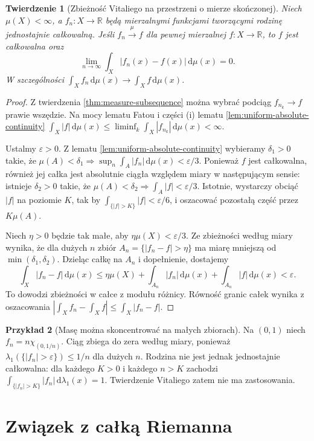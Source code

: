\documentclass[11pt,a4paper,oneside]{book}
\numberwithin{equation}{chapter}
\theoremstyle{plain}
\newtheorem{twierdzenie}{Twierdzenie}[chapter]
\theoremstyle{definition}
\newtheorem{przyklad}[twierdzenie]{Przykład}
\theoremstyle{remark}
\begin{document}
\begin{twierdzenie}[Zbieżność Vitaliego na przestrzeni o mierze skończonej]
\label{thm:vitali-l1}
Niech $\mu(X)<\infty$, a $f_n:X\to\mathbb R$ będą
mierzalnymi funkcjami tworzącymi rodzinę
jednostajnie całkowalną. Jeśli
$f_n\xrightarrow{\mu}f$ dla pewnej mierzalnej
$f:X\to\mathbb R$, to $f$ jest całkowalna oraz
\[
\lim_{n\to\infty}\int_X|f_n(x)-f(x)|\,\mathrm d\mu(x)=0.
\]
W szczególności $\int_Xf_n\,\mathrm d\mu(x)\to
\int_Xf\,\mathrm d\mu(x)$.
\end{twierdzenie}
\begin{proof}
Z twierdzenia \ref{thm:measure-subsequence}
można wybrać podciąg $f_{n_k}\to f$ prawie wszędzie.
Na mocy lematu Fatou i części (i) lematu
\ref{lem:uniform-absolute-continuity}
$\int_X|f|\,\mathrm d\mu(x)\le
\liminf_k\int_X|f_{n_k}|\,\mathrm d\mu(x)<\infty$.

Ustalmy $\varepsilon>0$. Z lematu
\ref{lem:uniform-absolute-continuity} wybieramy
$\delta_1>0$ takie, że
$\mu(A)<\delta_1\Rightarrow
\sup_n\int_A|f_n|\,\mathrm d\mu(x)<\varepsilon/3$.
Ponieważ $f$ jest całkowalna, również jej całka
jest absolutnie ciągła względem miary w następującym
sensie: istnieje $\delta_2>0$ takie, że
$\mu(A)<\delta_2\Rightarrow\int_A|f|<\varepsilon/3$.
Istotnie, wystarczy obciąć $|f|$ na poziomie $K$,
tak by $\int_{\{|f|>K\}}|f|<\varepsilon/6$,
i oszacować pozostałą część przez $K\mu(A)$.

Niech $\eta>0$ będzie tak małe, aby
$\eta\mu(X)<\varepsilon/3$. Ze zbieżności według
miary wynika, że dla dużych $n$ zbiór
$A_n=\{|f_n-f|>\eta\}$ ma miarę mniejszą od
$\min(\delta_1,\delta_2)$. Dzieląc całkę na
$A_n$ i dopełnienie, dostajemy
\[
\int_X|f_n-f|\,\mathrm d\mu(x)
\le\eta\mu(X)+\int_{A_n}|f_n|\,\mathrm d\mu(x)
+\int_{A_n}|f|\,\mathrm d\mu(x)<\varepsilon.
\]
To dowodzi zbieżności w całce z modułu różnicy.
Równość granic całek wynika z oszacowania
$|\int_X f_n-\int_X f|\le\int_X|f_n-f|$.
\end{proof}

\begin{przyklad}[Masę można skoncentrować na małych zbiorach]
Na $(0,1)$ niech $f_n=n\chi_{(0,1/n)}$.
Ciąg zbiega do zera według miary, ponieważ
$\lambda_1(\{|f_n|>\varepsilon\})\le1/n$
dla dużych $n$. Rodzina nie jest jednak jednostajnie
całkowalna: dla każdego $K>0$ i każdego $n>K$
zachodzi
$\int_{\{|f_n|>K\}}|f_n|\,\mathrm d\lambda_1(x)=1$.
Twierdzenie Vitaliego zatem nie ma zastosowania.
\end{przyklad}

\section{Związek z całką Riemanna}
\end{document}
